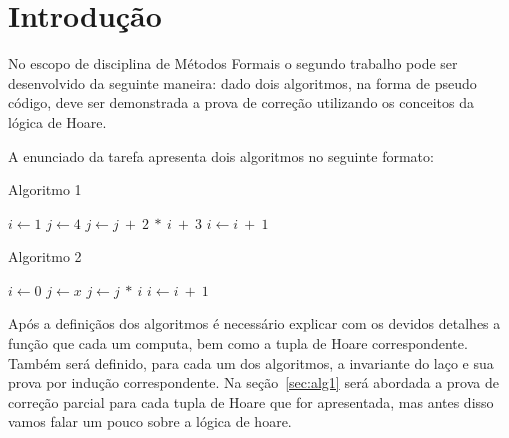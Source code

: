 \section{Introdução}
\label{sec:intro}

No escopo de disciplina de Métodos Formais o segundo trabalho pode ser
desenvolvido da seguinte maneira: dado dois algoritmos, na forma de pseudo
código, deve ser demonstrada a prova de correção utilizando os conceitos da
lógica de Hoare.

A enunciado da tarefa apresenta dois algoritmos no seguinte formato:

\begin{minipage}{6cm}
  \begin{algorithm}[H]
    \caption{Algoritmo 1}
    \begin{algorithmic}
      \State $i\gets 1$
      \State $j\gets 4$
      \State $j \gets j\ +\ 2\ *\ i\ +\ 3$
      \State $i\gets i\ +\ 1$
      \EndWhile
      \EndFunction
      \end{algorithmic}
  \end{algorithm}
\end{minipage}%
\begin{minipage}{7cm}
  \begin{algorithm}[H]
    \caption{Algoritmo 2}
    \begin{algorithmic}
      \State $i\gets 0$
      \State $j\gets x$
      \State $j \gets j\ *\ i$
      \State $i\gets i\ +\ 1$
      \EndWhile\label{euclidendwhile}
      \EndFunction
      \end{algorithmic}
  \end{algorithm}
\end{minipage}

\vspace{0.3cm}

Após a definiçãos dos algoritmos é necessário explicar com os devidos detalhes a
função que cada um computa, bem como a tupla de Hoare correspondente. Também
será definido, para cada um dos algoritmos, a invariante do laço e sua prova por
indução correspondente. Na seção~\ref{sec:alg1} será abordada a prova de
correção parcial para cada tupla de Hoare que for apresentada, mas antes disso
vamos falar um pouco sobre a lógica de hoare.
